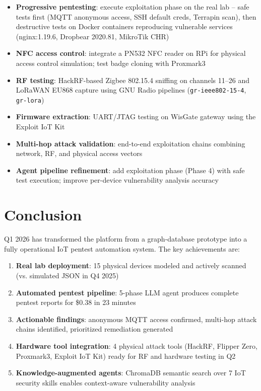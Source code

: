 \documentclass[11pt,a4paper]{article}
\begin{document}
\begin{itemize}
    \item \textbf{Progressive pentesting}: execute exploitation phase on the real lab -- safe tests first (MQTT anonymous access, SSH default creds, Terrapin scan), then destructive tests on Docker containers reproducing vulnerable services (nginx:1.19.6, Dropbear 2020.81, MikroTik CHR)
    \item \textbf{NFC access control}: integrate a PN532 NFC reader on RPi for physical access control simulation; test badge cloning with Proxmark3
    \item \textbf{RF testing}: HackRF-based Zigbee 802.15.4 sniffing on channels 11--26 and LoRaWAN EU868 capture using GNU Radio pipelines (\texttt{gr-ieee802-15-4}, \texttt{gr-lora})
    \item \textbf{Firmware extraction}: UART/JTAG testing on WisGate gateway using the Exploit IoT Kit
    \item \textbf{Multi-hop attack validation}: end-to-end exploitation chains combining network, RF, and physical access vectors
    \item \textbf{Agent pipeline refinement}: add exploitation phase (Phase 4) with safe test execution; improve per-device vulnerability analysis accuracy
\end{itemize}

\section{Conclusion}

Q1 2026 has transformed the platform from a graph-database prototype into a fully operational IoT pentest automation system. The key achievements are:

\begin{enumerate}
    \item \textbf{Real lab deployment}: 15 physical devices modeled and actively scanned (vs. simulated JSON in Q4 2025)
    \item \textbf{Automated pentest pipeline}: 5-phase LLM agent produces complete pentest reports for \$0.38 in 23 minutes
    \item \textbf{Actionable findings}: anonymous MQTT access confirmed, multi-hop attack chains identified, prioritized remediation generated
    \item \textbf{Hardware tool integration}: 4 physical attack tools (HackRF, Flipper Zero, Proxmark3, Exploit IoT Kit) ready for RF and hardware testing in Q2
    \item \textbf{Knowledge-augmented agents}: ChromaDB semantic search over 7 IoT security skills enables context-aware vulnerability analysis
\end{enumerate}
\end{document}
